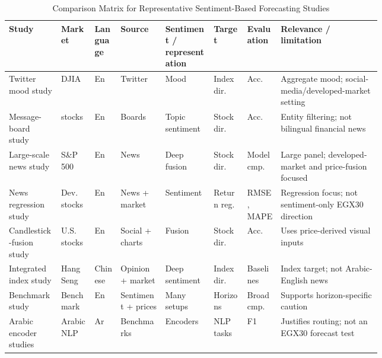 \begin{landscape}
\begin{table}[p]
\centering
\caption{Comparison Matrix for Representative Sentiment-Based Forecasting Studies}
\label{tab:related_matrix}
\small
\renewcommand{\arraystretch}{1.18}
\setlength{\tabcolsep}{4pt}
\begin{tabularx}{\linewidth}{@{}>{\raggedright\arraybackslash}p{0.14\linewidth}
                >{\raggedright\arraybackslash}p{0.09\linewidth}
                >{\raggedright\arraybackslash}p{0.07\linewidth}
                >{\raggedright\arraybackslash}p{0.12\linewidth}
                >{\raggedright\arraybackslash}p{0.13\linewidth}
                >{\raggedright\arraybackslash}p{0.09\linewidth}
                >{\raggedright\arraybackslash}p{0.09\linewidth}
                >{\raggedright\arraybackslash}X@{}}
\toprule
Study & Market & Language & Source & Sentiment / representation & Target & Evaluation & Relevance / limitation \\
\midrule
Twitter mood study \cite{bollen2011twitter} & DJIA & En & Twitter & Mood & Index dir. & Acc. & Aggregate mood; social-media/developed-market setting \\
Message-board study \cite{nguyen2015social} & 18 stocks & En & Boards & Topic sentiment & Stock dir. & Acc. & Entity filtering; not bilingual financial news \\
Large-scale news study \cite{mohan2019news} & S\&P 500 & En & News & Deep fusion & Stock dir. & Model cmp. & Large panel; developed-market and price-fusion focused \\
News regression study \cite{dahal2023comparative} & Dev. stocks & En & News + market & Sentiment & Return reg. & RMSE, MAPE & Regression focus; not sentiment-only EGX30 direction \\
Candlestick-fusion study \cite{huang2021candlestick} & U.S. stocks & En & Social + charts & Fusion & Stock dir. & Acc. & Uses price-derived visual inputs \\
Integrated index study \cite{zhao2023integrated} & Hang Seng & Chinese & Opinion + market & Deep sentiment & Index dir. & Baselines & Index target; not Arabic-English news \\
Benchmark study \cite{liapis2023deep} & Benchmark & En & Sentiment + prices & Many setups & Horizons & Broad cmp. & Supports horizon-specific caution \\
Arabic encoder studies \cite{antoun2020arabert,inoue2021camelbert} & Arabic NLP & Ar & Benchmarks & Encoders & NLP tasks & F1 & Justifies routing; not an EGX30 forecast test \\
\bottomrule
\end{tabularx}
\end{table}
\end{landscape}

